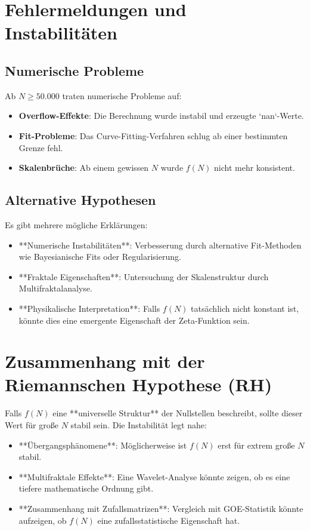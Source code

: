 \documentclass[a4paper,12pt]{article}
\begin{document}
\section{Fehlermeldungen und Instabilitäten}
\subsection{Numerische Probleme}
Ab \( N \geq 50.000 \) traten numerische Probleme auf:

\begin{itemize}
    \item \textbf{Overflow-Effekte}: Die Berechnung wurde instabil und erzeugte `nan`-Werte.
    \item \textbf{Fit-Probleme}: Das Curve-Fitting-Verfahren schlug ab einer bestimmten Grenze fehl.
    \item \textbf{Skalenbrüche}: Ab einem gewissen \( N \) wurde \( f(N) \) nicht mehr konsistent.
\end{itemize}

\subsection{Alternative Hypothesen}
Es gibt mehrere mögliche Erklärungen:

\begin{itemize}
    \item **Numerische Instabilitäten**: Verbesserung durch alternative Fit-Methoden wie Bayesianische Fits oder Regularisierung.
    \item **Fraktale Eigenschaften**: Untersuchung der Skalenstruktur durch Multifraktalanalyse.
    \item **Physikalische Interpretation**: Falls \( f(N) \) tatsächlich nicht konstant ist, könnte dies eine emergente Eigenschaft der Zeta-Funktion sein.
\end{itemize}

\section{Zusammenhang mit der Riemannschen Hypothese (RH)}
Falls \( f(N) \) eine **universelle Struktur** der Nullstellen beschreibt, sollte dieser Wert für große \( N \) stabil sein. Die Instabilität legt nahe:

\begin{itemize}
    \item **Übergangsphänomene**: Möglicherweise ist \( f(N) \) erst für extrem große \( N \) stabil.
    \item **Multifraktale Effekte**: Eine Wavelet-Analyse könnte zeigen, ob es eine tiefere mathematische Ordnung gibt.
    \item **Zusammenhang mit Zufallsmatrizen**: Vergleich mit GOE-Statistik könnte aufzeigen, ob \( f(N) \) eine zufallsstatistische Eigenschaft hat.
\end{itemize}
\end{document}
